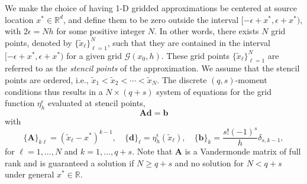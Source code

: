 We make the choice of having 1-D gridded approximations be centered at source location $x^*\in\mathbb R^d$, and define them to be zero outside the interval $[-\epsilon+x^*,\epsilon+x^*)$, with $2\epsilon=Nh$ for some positive integer $N$.
In other words, there exists $N$ grid points, denoted by $\{\tilde x_\ell\}_{\ell=1}^{N}$, such that they are contained in the interval $[-\epsilon+x^*,\epsilon+x^*)$ for a given grid $\mathcal G(x_0,h)$.
These grid points $\{\tilde x_\ell\}_{\ell=1}^N$ are referred to as the \emph{stencil points} of the approximation.
We assume that the stencil points are ordered, i.e., $\tilde x_1<\tilde x_2<\cdots<\tilde x_{N}$.
The discrete $(q,s)$-moment conditions thus results in a $N\times(q+s)$ system of equations for the grid function $\eta_h^\epsilon$ evaluated at stencil points,
\[
	\mathbf A \mathbf d = \mathbf b
\]
with 
\[
	\{\mathbf A\}_{k\ell} = (\tilde x_\ell-x^*)^{k-1}, \quad \{\mathbf d\}_{\ell}=\eta_h^\epsilon(\tilde x_\ell), \quad \{\mathbf b\}_{k}= \frac{s! (-1)^s}{h} \delta_{s,k-1},
\]
for $\ell=1,...,N$ and $k=1,...,q+s$.
Note that $\mathbf A$ is a Vandermonde matrix of full rank and is guaranteed a solution if $N\ge q+s$ and no solution for $N<q+s$ under general $x^*\in\mathbb R$.

